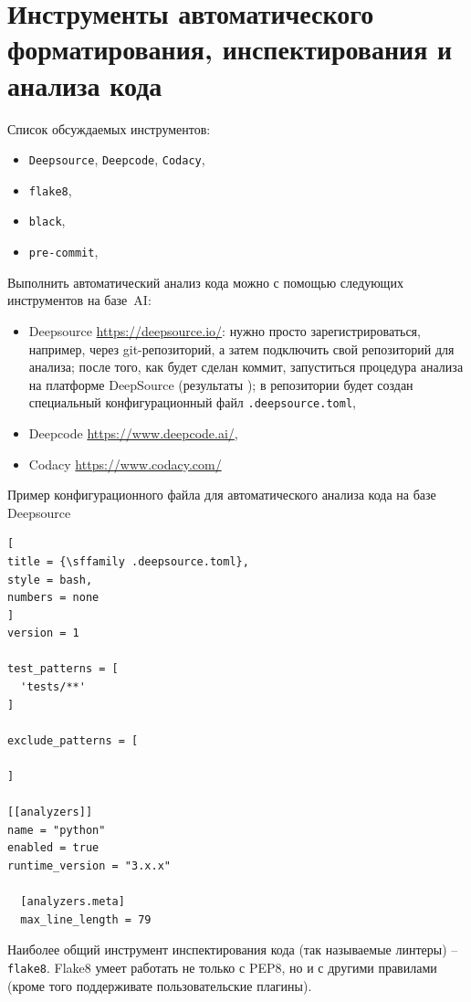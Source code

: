 \documentclass[%
	11pt,
	a4paper,
	utf8,
		]{article}
\begin{document}
\section{Инструменты автоматического форматирования, инспектирования и анализа кода}

Список обсуждаемых инструментов:
\begin{itemize}
	\item \texttt{Deepsource}, \texttt{Deepcode}, \texttt{Codacy}, 
	
	\item \texttt{flake8},
	
	\item \texttt{black},
	
	\item \texttt{pre-commit},
	
	
\end{itemize}

Выполнить автоматический анализ кода можно с помощью следующих инструментов на базе~AI:
\begin{itemize}
	\item Deepsource \url{https://deepsource.io/}: нужно просто зарегистрироваться, например, через git-репозиторий, а затем подключить свой репозиторий для анализа; после того, как будет сделан коммит, запуститься процедура анализа на платформе DeepSource (результаты ); в репозитории будет создан специальный конфигурационный файл \texttt{.deepsource.toml},
	
	\item Deepcode \url{https://www.deepcode.ai/},
	
	\item Codacy \url{https://www.codacy.com/}
\end{itemize}

Пример конфигурационного файла для автоматического анализа кода на базе Deepsource
\begin{lstlisting}[
title = {\sffamily .deepsource.toml},
style = bash,
numbers = none	
]
version = 1

test_patterns = [
  'tests/**'
]

exclude_patterns = [

]

[[analyzers]]
name = "python"
enabled = true
runtime_version = "3.x.x"

  [analyzers.meta]
  max_line_length = 79
\end{lstlisting}

Наиболее общий инструмент инспектирования кода (так называемые линтеры) -- \texttt{flake8}. Flake8 умеет работать не только с PEP8, но и с другими правилами (кроме того поддерживате пользовательские плагины).
\end{document}
